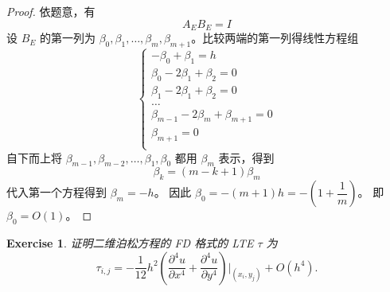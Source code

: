 \documentclass{ctexart}
\newtheorem{ex}{Exercise}
\begin{document}
\begin{proof}
    依题意，有
    \begin{equation}
        A_EB_E = I
    \end{equation}
    设 $B_E$ 的第一列为 $\beta_0,\beta_1,\dots,\beta_m,\beta_{m+1}$。比较两端的第一列得线性方程组
    \begin{equation}
        \begin{cases}
            -\beta_0+\beta_1 = h\\
            \beta_0-2\beta_1+\beta_2 = 0\\
            \beta_1-2\beta_1+\beta_2 = 0\\
            \dots\\
            \beta_{m-1}-2\beta_m+\beta_{m+1} = 0\\
            \beta_{m+1} = 0\\
        \end{cases}
    \end{equation}
    自下而上将 $\beta_{m-1},\beta_{m-2},\dots,\beta_1,\beta_0$ 都用 $\beta_m$ 表示，得到
    \begin{equation}
        \beta_k = (m-k+1)\beta_m
    \end{equation}
    代入第一个方程得到 $\beta_m = -h$。
    因此 $\beta_0 = -(m+1)h = -(1+\dfrac 1m)$。
    即 $\beta_0 = O(1)$。
\end{proof}

\begin{ex}
    证明二维泊松方程的 FD 格式的 LTE $\tau$ 为
    \begin{equation}
        \tau_{i,j} = -\dfrac 1{12}h^2(\dfrac{\partial^4u}{\partial x^4}+\dfrac{\partial^4u}{\partial y^4})|_{(x_i,y_j)} + O(h^4).
    \end{equation}
\end{ex}
\end{document}
